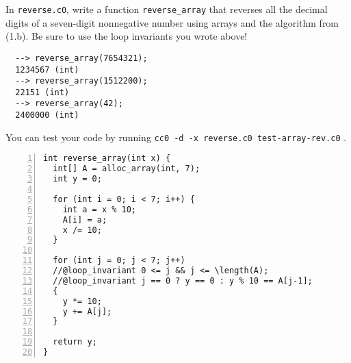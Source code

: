 \begin{part}
  In \lstinline'reverse.c0', write a function
  \lstinline'reverse_array' that reverses all the decimal digits of a
  seven-digit nonnegative number using arrays and the algorithm from
  (1.b). Be sure to use the loop invariants you wrote above!

\begin{lstlisting}[language={[coin]C}, basicstyle=\smallbasicstyle]
  % coin -d reverse.c0
  --> reverse_array(7654321);
  1234567 (int)
  --> reverse_array(1512200);
  22151 (int)
  --> reverse_array(42);
  2400000 (int)
\end{lstlisting}

You can test your code by running %
\lstinline[language={[coin]C}]'cc0 -d -x reverse.c0 test-array-rev.c0' .

\begin{solution}
\begin{lstlisting}[numbers=left]
int reverse_array(int x) {
  int[] A = alloc_array(int, 7);
  int y = 0;

  for (int i = 0; i < 7; i++) {
    int a = x % 10;
    A[i] = a;
    x /= 10;
  }

  for (int j = 0; j < 7; j++)
  //@loop_invariant 0 <= j && j <= \length(A);
  //@loop_invariant j == 0 ? y == 0 : y % 10 == A[j-1];
  {
    y *= 10;
    y += A[j];
  }

  return y;
}
\end{lstlisting}
\end{solution}
\end{part}
